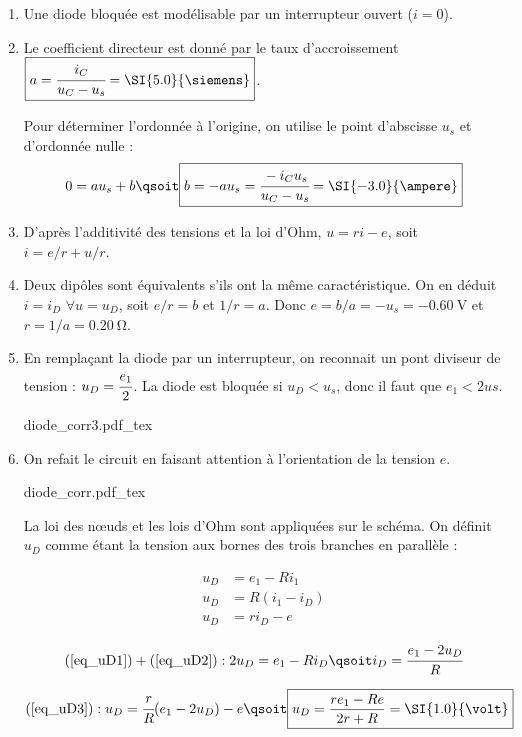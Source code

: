 \documentclass[a4paper, 10pt, garamond, oneside]{book}
\begin{document}
{
	\begin{enumerate}
		\item Une diode bloquée est modélisable par un interrupteur ouvert ($i=0$).
		\item Le coefficient directeur est donné par le taux d'accroissement
		      $\boxed{a=\cfrac{i_C}{u_C-u_s}=\SI{5.0}{\siemens}}$.

		      Pour déterminer l'ordonnée à l'origine, on utilise le point
		      d'abscisse $u_s$ et d'ordonnée nulle :
		      \[
			      0=au_s+b\qsoit
			      \boxed{b=-au_s=\cfrac{-i_Cu_s}{u_C-u_s}=\SI{-3.0}{\ampere}}
		      \]
		\item D'après l'additivité des tensions et la loi d'Ohm, $u=ri-e$, soit
		      $\boxed{i=e/r+u/r}$.
		\item Deux dipôles sont équivalents s'ils ont la même caractéristique. On
		      en déduit $i=i_D$ $\forall u=u_D$, soit $e/r=b$ et $1/r=a$. Donc
		      $\boxed{e=b/a=-u_s=\SI{-0,60}{\volt}}$ et $\boxed{r=1/a=\SI{0,20}{\ohm}}$.
		\item En remplaçant la diode par un interrupteur, on reconnait un pont
		      diviseur de tension : $u_D=\cfrac{e_1}{2}$. La diode est bloquée si
		      $u_D<u_s$, donc il faut que $\boxed{e_1<2us}$.
		      \begin{center}
			      {diode_corr3.pdf_tex}
		      \end{center}
		\item On refait le circuit en faisant attention à l'orientation de la
		      tension $e$.
		      \begin{center}
			      {diode_corr.pdf_tex}
		      \end{center}

		      La loi des nœuds et les lois d'Ohm sont appliquées sur le schéma.
		      On définit $u_D$ comme étant la tension aux bornes des trois
		      branches en parallèle :

		      \begin{align}
			      u_D & =e_1-Ri_1\label{eq_uD1}   \\
			      u_D & =R(i_1-i_D)\label{eq_uD2} \\
			      u_D & =ri_D-e\label{eq_uD3}
		      \end{align}


		      \[
			      (\ref{eq_uD1})+(\ref{eq_uD2}) : 2u_D=e_1-Ri_D
			      \qsoit  i_D=\cfrac{e_1-2u_D}{R}
		      \]

		      \[
			      (\ref{eq_uD3}) : u_D=\cfrac{r}{R}(e_1-2u_D)-e
			      \qsoit \boxed{u_D=\frac{re_1-Re}{2r+R}=\SI{1.0}{\volt}}
		      \]


\end{enumerate}}
\end{document}
